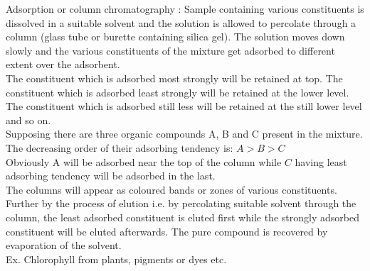 \documentclass[10pt]{article}
\begin{document}
Adsorption or column chromatography : Sample containing various constituents is dissolved in a suitable solvent and the solution is allowed to percolate through a column (glass tube or burette containing silica gel). The solution moves down slowly and the various constituents of the mixture get adsorbed to different extent over the adsorbent.\\
The constituent which is adsorbed most strongly will be retained at top. The constituent which is adsorbed least strongly will be retained at the lower level.\\
The constituent which is adsorbed still less will be retained at the still lower level and so on.\\
Supposing there are three organic compounds A, B and C present in the mixture. The decreasing order of their adsorbing tendency is: $A>B>C$\\
Obviously A will be adsorbed near the top of the column while $C$ having least adsorbing tendency will be adsorbed in the last.\\
The columns will appear as coloured bands or zones of various constituents.\\
Further by the process of elution i.e. by percolating suitable solvent through the column, the least adsorbed constituent is eluted first while the strongly adsorbed constituent will be eluted afterwards. The pure compound is recovered by evaporation of the solvent.\\
Ex. Chlorophyll from plants, pigments or dyes etc.\\
\end{document}
